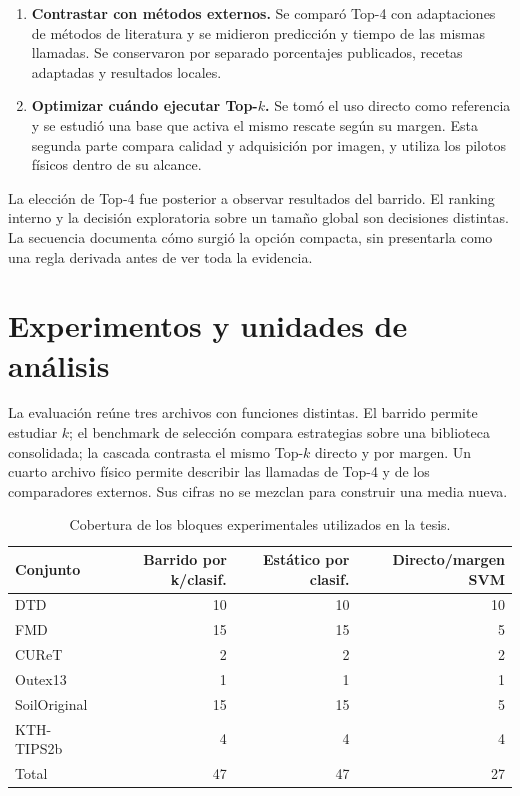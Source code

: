 \begin{enumerate}
\item \textbf{Contrastar con métodos externos.} Se comparó Top-4 con adaptaciones de métodos de literatura y se midieron predicción y tiempo de las mismas llamadas. Se conservaron por separado porcentajes publicados, recetas adaptadas y resultados locales.
\item \textbf{Optimizar cuándo ejecutar Top-\(k\).} Se tomó el uso directo como referencia y se estudió una base que activa el mismo rescate según su margen. Esta segunda parte compara calidad y adquisición por imagen, y utiliza los pilotos físicos dentro de su alcance.
\end{enumerate}
La elección de Top-4 fue posterior a observar resultados del barrido. El ranking interno y la decisión exploratoria sobre un tamaño global son decisiones distintas. La secuencia documenta cómo surgió la opción compacta, sin presentarla como una regla derivada antes de ver toda la evidencia.

\section{Experimentos y unidades de análisis}
La evaluación reúne tres archivos con funciones distintas. El barrido permite estudiar \(k\); el benchmark de selección compara estrategias sobre una biblioteca consolidada; la cascada contrasta el mismo Top-\(k\) directo y por margen. Un cuarto archivo físico permite describir las llamadas de Top-4 y de los comparadores externos. Sus cifras no se mezclan para construir una media nueva.

\begin{table}[!htbp]\centering\small
\caption{Cobertura de los bloques experimentales utilizados en la tesis.}
\label{tab:cobertura}
\begin{tabular}{@{}lrrr@{}}\toprule
Conjunto & Barrido por k/clasif. & Estático por clasif. & Directo/margen SVM\\\midrule
DTD & 10 & 10 & 10\\
FMD & 15 & 15 & 5\\
CUReT & 2 & 2 & 2\\
Outex13 & 1 & 1 & 1\\
SoilOriginal & 15 & 15 & 5\\
KTH-TIPS2b & 4 & 4 & 4\\\midrule
Total & 47 & 47 & 27\\
\bottomrule\end{tabular}
\end{table}

